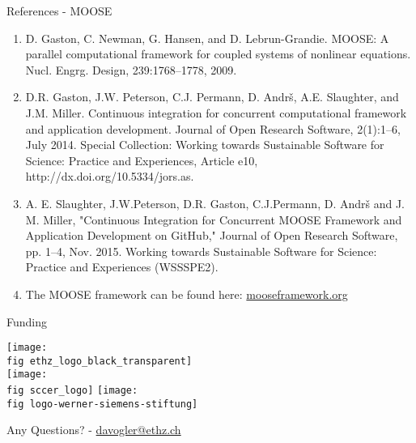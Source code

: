 \documentclass[first,firstsupp,svgnames,9pt]{ethz_beamer}
\begin{document}
\begin{frame}{References - MOOSE}
  \begin{enumerate}
    \item D. Gaston, C. Newman, G. Hansen, and D. Lebrun-Grandie. MOOSE: A parallel computational framework for coupled systems of nonlinear equations. Nucl. Engrg. Design, 239:1768–1778, 2009. \\[5pt]
    \item D.R. Gaston, J.W. Peterson, C.J. Permann, D. Andrš, A.E. Slaughter, and J.M. Miller. Continuous integration for concurrent computational framework and application development. Journal of Open Research Software, 2(1):1–6, July 2014. Special Collection: Working towards Sustainable Software for Science: Practice and Experiences, Article e10, http://dx.doi.org/10.5334/jors.as. \\[5pt]
    \item A. E. Slaughter, J.W.Peterson, D.R. Gaston, C.J.Permann, D. Andrš and J. M. Miller, "Continuous Integration for Concurrent MOOSE Framework and Application Development on GitHub," Journal of Open Research Software, pp. 1–4, Nov. 2015. Working towards Sustainable Software for Science: Practice and Experiences (WSSSPE2). \\[5pt]
    \item The MOOSE framework can be found here: \url{mooseframework.org}
  \end{enumerate}
\end{frame}

\begin{frame}[c]{Funding}
  \begin{center}
    \texttt{[image: \\fig ethz\_logo\_black\_transparent]}\\[30pt]
    \texttt{[image: \\fig sccer\_logo]}
    \hfill
    \texttt{[image: \\fig logo-werner-siemens-stiftung]}
  \end{center}
\end{frame}

\begin{frame}
\begin{center}
\alert{\Huge{Any Questions?}}
\vskip 0.5cm
-
\vskip 0.5cm
\large{\url{davogler@ethz.ch} }
\end{center}
\end{frame}

\begin{frame}
  \Wider[3ex]{
  \maketitle
  \begin{center}
    \insertemail
  \end{center}
  }
\end{frame}
\end{document}
